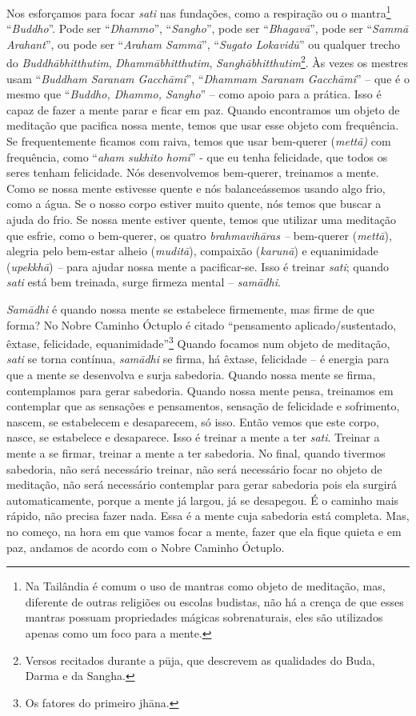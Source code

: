 Nos esforçamos para focar \textit{sati} nas fundações, como a
respiração ou o mantra\footnote{Na Tailândia é comum o uso de mantras
como objeto de meditação, mas, diferente de outras religiões ou escolas
budistas, não há a crença de que esses mantras possuam propriedades
mágicas sobrenaturais, eles são utilizados apenas como um foco para a
mente.} “\textit{Buddho}”. Pode ser “\textit{Dhammo}”,
“\textit{Sangho}”, pode ser “\textit{Bhagavā}”, pode ser
“\textit{Sammā Arahant}”, ou pode ser “\textit{Araham Sammā}”,
“\textit{Sugato Lokavidū}” ou qualquer trecho do
\textit{Buddhābhitthutim}, \textit{Dhammābhitthutim},
\textit{Sanghābhitthutim}\footnote{Versos recitados durante a pūja,
que descrevem as qualidades do Buda, Darma e da Sangha.}. Às vezes os
mestres usam “\textit{Buddham Saranam Gacchāmi}”, “\textit{Dhammam
Saranam Gacchāmi}” – que é o mesmo que “\textit{Buddho, Dhammo,
Sangho}” – como apoio para a prática. Isso é capaz de fazer a mente
parar e ficar em paz. Quando encontramos um objeto de meditação que
pacifica nossa mente, temos que usar esse objeto com frequência. Se
frequentemente ficamos com raiva, temos que usar bem-querer
(\textit{mettā)} com frequência, como “\textit{aham sukhito homi}” -
que eu tenha felicidade, que todos os seres tenham felicidade. Nós
desenvolvemos bem-querer, treinamos a mente. Como se nossa mente
estivesse quente e nós balanceássemos usando algo frio, como a água. Se
o nosso corpo estiver muito quente, nós temos que buscar a ajuda do
frio. Se nossa mente estiver quente, temos que utilizar uma meditação
que esfrie, como o bem-querer, os quatro \textit{brahmavihāras –}
bem-querer (\textit{mettā}), alegria pelo bem-estar alheio
(\textit{muditā}), compaixão (\textit{karunā}) e equanimidade
(\textit{upekkhā})\textit{ –} para ajudar nossa mente a pacificar-se.
Isso é treinar \textit{sati}; quando \textit{sati} está bem treinada,
surge firmeza mental – \textit{samādhi}. 

\textit{Samādhi} é quando nossa mente se estabelece firmemente,
mas firme de que forma? No Nobre Caminho Óctuplo é citado “pensamento
aplicado/sustentado, êxtase, felicidade, equanimidade”\footnote{Os
fatores do primeiro jhāna.} Quando focamos num objeto de meditação,
\textit{sati} se torna contínua, \textit{samādhi} se firma, há
êxtase, felicidade – é energia para que a mente se desenvolva e surja
sabedoria. Quando nossa mente se firma, contemplamos para gerar
sabedoria. Quando nossa mente pensa, treinamos em contemplar que as
sensações e pensamentos, sensação de felicidade e sofrimento, nascem,
se estabelecem e desaparecem, só isso. Então vemos que este corpo,
nasce, se estabelece e desaparece. Isso é treinar a mente a ter
\textit{sati}. Treinar a mente a se firmar, treinar a mente a ter
sabedoria. No final, quando tivermos sabedoria, não será necessário
treinar, não será necessário focar no objeto de meditação, não será
necessário contemplar para gerar sabedoria pois ela surgirá
automaticamente, porque a mente já largou, já se desapegou. É o caminho
mais rápido, não precisa fazer nada. Essa é a mente cuja sabedoria está
completa. Mas, no começo, na hora em que vamos focar a mente, fazer que
ela fique quieta e em paz, andamos de acordo com o Nobre Caminho
Óctuplo. 

